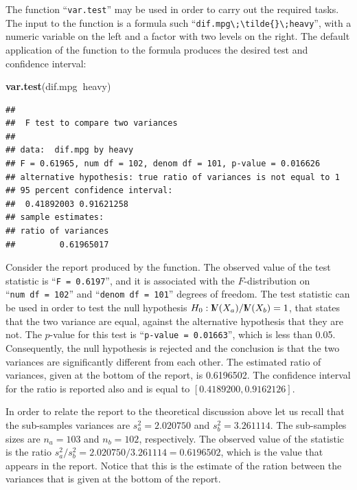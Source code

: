 \documentclass[]{krantz}
\makeatletter
\newenvironment{Shaded}{\begin{snugshade}}{\end{snugshade}}
\newcommand{\KeywordTok}[1]{\textcolor[rgb]{0.13,0.29,0.53}{\textbf{#1}}}
\newcommand{\OperatorTok}[1]{\textcolor[rgb]{0.81,0.36,0.00}{\textbf{#1}}}
\newcommand{\NormalTok}[1]{#1}
\newcommand{\Var}{{\rm I\kern-.3em V}}
\newenvironment{kframe}{%
\medskip{}
\setlength{\fboxsep}{.8em}
 \def\at@end@of@kframe{}%
 \ifinner\ifhmode%
  \def\at@end@of@kframe{\end{minipage}}%
  \begin{minipage}{\columnwidth}%
 \fi\fi%
 \def\FrameCommand##1{\hskip\@totalleftmargin \hskip-\fboxsep
 \colorbox{shadecolor}{##1}\hskip-\fboxsep
     \hskip-\linewidth \hskip-\@totalleftmargin \hskip\columnwidth}%
 \MakeFramed {\advance\hsize-\width
   \@totalleftmargin\z@ \linewidth\hsize
   \@setminipage}}%
 {\par\unskip\endMakeFramed%
 \at@end@of@kframe}
\renewenvironment{Shaded}{\begin{kframe}}{\end{kframe}}
\theoremstyle{definition}
\theoremstyle{definition}
\theoremstyle{definition}
\theoremstyle{remark}
\makeatother
\begin{document}
The function ``\texttt{var.test}'' may be used in order to carry out the
required tasks. The input to the function is a formula such
``\texttt{dif.mpg\textbackslash{};\textbackslash{}tilde\{\}\textbackslash{};heavy}'',
with a numeric variable on the left and a factor with two levels on the
right. The default application of the function to the formula produces
the desired test and confidence interval:

\begin{Shaded}
\begin{Highlighting}[]
\KeywordTok{var.test}\NormalTok{(dif.mpg}\OperatorTok{~}\NormalTok{heavy)}
\end{Highlighting}
\end{Shaded}

\begin{verbatim}
## 
##  F test to compare two variances
## 
## data:  dif.mpg by heavy
## F = 0.61965, num df = 102, denom df = 101, p-value = 0.016626
## alternative hypothesis: true ratio of variances is not equal to 1
## 95 percent confidence interval:
##  0.41892003 0.91621258
## sample estimates:
## ratio of variances 
##         0.61965017
\end{verbatim}

Consider the report produced by the function. The observed value of the
test statistic is ``\texttt{F\ =\ 0.6197}'', and it is associated with
the \(F\)-distribution on ``\texttt{num\ df\ =\ 102}'' and
``\texttt{denom\ df\ =\ 101}'' degrees of freedom. The test statistic
can be used in order to test the null hypothesis
\(H_0: \Var(X_a)/\Var(X_b) = 1\), that states that the two variance are
equal, against the alternative hypothesis that they are not. The
\(p\)-value for this test is ``\texttt{p-value\ =\ 0.01663}'', which is
less than 0.05. Consequently, the null hypothesis is rejected and the
conclusion is that the two variances are significantly different from
each other. The estimated ratio of variances, given at the bottom of the
report, is 0.6196502. The confidence interval for the ratio is reported
also and is equal to \([0.4189200, 0.9162126]\).

In order to relate the report to the theoretical discussion above let us
recall that the sub-samples variances are \(s^2_a = 2.020750\) and
\(s_b^2 = 3.261114\). The sub-samples sizes are \(n_a = 103\) and
\(n_b = 102\), respectively. The observed value of the statistic is the
ratio \(s_a^2/s_b^2 = 2.020750/3.261114 = 0.6196502\), which is the
value that appears in the report. Notice that this is the estimate of
the ration between the variances that is given at the bottom of the
report.
\end{document}
